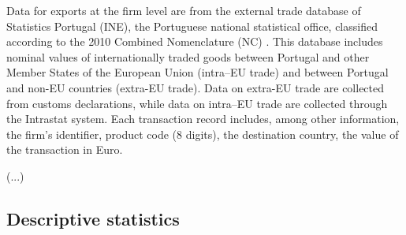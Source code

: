 \documentclass[a4paper,12pt]{article}
\begin{document}
Data for exports at the firm level are from the external trade database of
Statistics Portugal (INE), the Portuguese national statistical office, classified according to the 2010 Combined Nomenclature (NC) \citep{ine2018ci}. This database includes nominal values of internationally traded goods between Portugal and other Member States of the European Union (intra--EU trade) and between Portugal and non-EU countries (extra-EU trade). Data on extra-EU trade are collected from customs declarations, while data on intra--EU trade are collected through the Intrastat system. Each transaction record includes, among other information, the firm’s identifier, product code (8 digits), the destination country, the value of the transaction in Euro.

	\vspace{0.5cm}
	(...)
	\vspace{0.5cm}




\subsection{Descriptive statistics}\label{sec:statistics}
\end{document}
